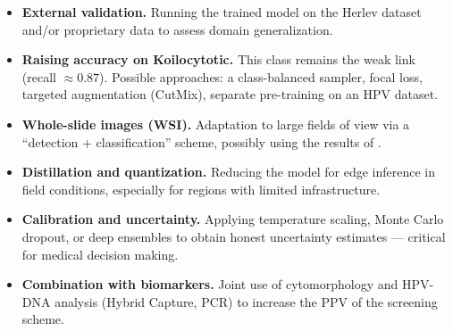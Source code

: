 \documentclass[14pt,a4paper]{extreport}
\begin{document}
\begin{itemize}
    \item \textbf{External validation.} Running the trained model on the
          Herlev dataset and/or proprietary data to assess
          domain generalization.
    \item \textbf{Raising accuracy on Koilocytotic.} This class remains
          the weak link (recall $\approx 0.87$). Possible approaches: a
          class-balanced sampler, focal loss, targeted augmentation
          (CutMix), separate pre-training on an HPV dataset.
    \item \textbf{Whole-slide images (WSI).} Adaptation to large fields
          of view via a ``detection + classification'' scheme, possibly
          using the results of \cite{zhang2025large}.
    \item \textbf{Distillation and quantization.} Reducing the model for
          edge inference in field conditions, especially for regions
          with limited infrastructure.
    \item \textbf{Calibration and uncertainty.} Applying temperature
          scaling, Monte Carlo dropout, or deep ensembles to obtain
          honest uncertainty estimates --- critical for medical decision
          making.
    \item \textbf{Combination with biomarkers.} Joint use of
          cytomorphology and HPV-DNA analysis (Hybrid Capture, PCR) to
          increase the PPV of the screening scheme.
\end{itemize}
\end{document}
